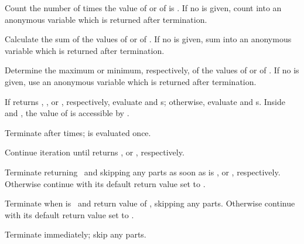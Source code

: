 \begin{LIST}{1cm}
\begin{LIST}{.5cm}
    {
    Count the number of times the value of  or of  is \T.
    If no  is given, count into an anonymous variable
    which is returned after termination.
    }

    {
    Calculate the sum of the values of  or of .
    If no  is given, sum into an anonymous variable
    which is returned after termination.
    }

    {
    Determine the maximum or minimum, respectively, of the values of
     or of . 
    If no  is given, use an anonymous variable
    which is returned after termination.
    }

    {
    If  returns \T, \T, or \NIL, respectively, evaluate
     and s; otherwise, evaluate 
    and s. Inside  and , the value
    of  is accessible by . 
    }

    {
    Terminate  after  times;  is evaluated once.
    }

    {
    Continue iteration until  returns \NIL, or \T, respectively.
    }

    {
    Terminate  returning \NIL\ and skipping any
     parts as soon as  is \NIL, or \T,
    respectively. Otherwise continue  with its default return
    value set to \T. 
    }

    {
    Terminate  when  is \T\ and return value of
    , skipping any  parts. Otherwise continue
     with its default return value set to \NIL. 
    }

    {
    Terminate  immediately; skip any  parts.
    }
  \end{LIST}
\end{LIST}



